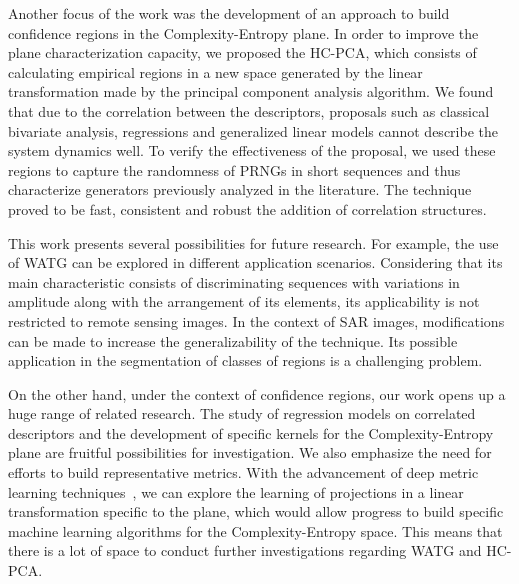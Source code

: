 Another focus of the work was the development of an approach to build confidence regions in the Complexity-Entropy plane.
In order to improve the plane characterization capacity, we proposed the HC-PCA, which consists of calculating empirical regions in a new space generated by the linear transformation made by the principal component analysis algorithm.
We found that due to the correlation between the descriptors, proposals such as classical bivariate analysis, regressions and generalized linear models cannot describe the system dynamics well.
To verify the effectiveness of the proposal, we used these regions to capture the randomness of PRNGs in short sequences and thus characterize generators previously analyzed in the literature.
The technique proved to be fast, consistent and robust the addition of correlation structures.

This work presents several possibilities for future research.
For example, the use of WATG can be explored in different application scenarios.
Considering that its main characteristic consists of discriminating sequences with variations in amplitude along with the arrangement of its elements, its applicability is not restricted to remote sensing images.
In the context of SAR images, modifications can be made to increase the generalizability of the technique.
Its possible application in the segmentation of classes of regions is a challenging problem.

On the other hand, under the context of confidence regions, our work opens up a huge range of related research.
The study of regression models on correlated descriptors and the development of specific kernels for the Complexity-Entropy plane are fruitful possibilities for investigation.
We also emphasize the need for efforts to build representative metrics.
With the advancement of deep metric learning techniques~\citep{barros2020new}, we can explore the learning of projections in a linear transformation specific to the plane, which would allow progress to build specific machine learning algorithms for the Complexity-Entropy space.
This means that there is a lot of space to conduct further investigations regarding WATG and HC-PCA.